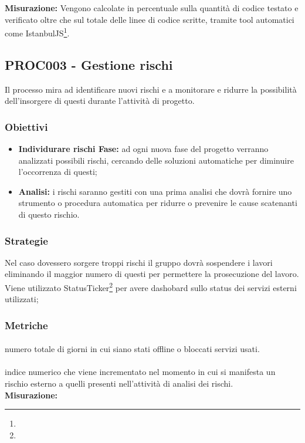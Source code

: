 \documentclass[PianoDiQualifica.tex]{subfiles}
\begin{document}
\textbf{Misurazione:}
Vengono calcolate in percentuale sulla quantità di codice testato e verificato oltre che sul totale delle linee di codice scritte, tramite tool automatici come IstanbulJS\footnote{}.


\subsection{PROC003 - Gestione rischi}
Il processo mira ad identificare nuovi rischi e a monitorare e ridurre la possibilità dell'insorgere di questi durante l'attività di progetto.
\subsubsection{Obiettivi}
\begin{itemize}
	\item \textbf{Individurare rischi Fase:} ad ogni nuova fase del progetto verranno analizzati possibili rischi, cercando delle soluzioni automatiche per diminuire l'occorrenza di questi;
	\item \textbf{Analisi:} i rischi saranno gestiti con una prima analisi che dovrà fornire uno strumento o procedura automatica per ridurre o prevenire le cause scatenanti di questo rischio.
\end{itemize}
\subsubsection{Strategie}
Nel caso dovessero sorgere troppi rischi il gruppo dovrà sospendere i lavori eliminando il maggior numero di questi per permettere la prosecuzione del lavoro.
Viene utilizzato StatusTicker\footnote{} per avere dashobard sullo status dei servizi esterni utilizzati;

\subsubsection{Metriche}
\paragraph{}
 numero totale di giorni in cui siano stati offline o bloccati servizi usati.\\

\paragraph{}
 indice numerico che viene incrementato nel momento in cui si manifesta un
rischio esterno a quelli presenti nell’attività di analisi dei rischi.\\
\textbf{Misurazione:}
\end{document}
